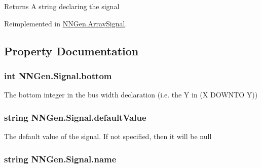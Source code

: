 \begin{DoxyReturn}{Returns}
A string declaring the signal
\end{DoxyReturn}


Reimplemented in \hyperlink{class_n_n_gen_1_1_array_signal_a2fa5704a3963a12c2bb188520681a9e6}{N\+N\+Gen.\+Array\+Signal}.



\subsection{Property Documentation}
\hypertarget{class_n_n_gen_1_1_signal_a62c486db61e28bb2348c2534f25780cc}{}
\subsubsection[{bottom}]{\setlength{\rightskip}{0pt plus 5cm}int N\+N\+Gen.\+Signal.\+bottom\hspace{0.3cm}{\ttfamily [get]}}\label{class_n_n_gen_1_1_signal_a62c486db61e28bb2348c2534f25780cc}


The bottom integer in the bus width declaration (i.\+e. the \textquotesingle{}Y\textquotesingle{} in (X D\+O\+W\+N\+T\+O Y)) 

\hypertarget{class_n_n_gen_1_1_signal_ac98333aa2ce1fdd3f3748ba8cfc4b932}{}
\subsubsection[{default\+Value}]{\setlength{\rightskip}{0pt plus 5cm}string N\+N\+Gen.\+Signal.\+default\+Value\hspace{0.3cm}{\ttfamily [get]}}\label{class_n_n_gen_1_1_signal_ac98333aa2ce1fdd3f3748ba8cfc4b932}


The default value of the signal. If not specified, then it will be null 

\hypertarget{class_n_n_gen_1_1_signal_ae7a3bd5d6385e96cbd244dfdf674a6e6}{}
\subsubsection[{name}]{\setlength{\rightskip}{0pt plus 5cm}string N\+N\+Gen.\+Signal.\+name\hspace{0.3cm}{\ttfamily [get]}}\label{class_n_n_gen_1_1_signal_ae7a3bd5d6385e96cbd244dfdf674a6e6}


